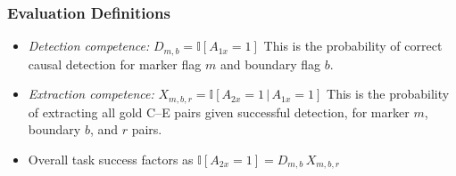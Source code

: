 \documentclass[conference]{IEEEtran}
\begin{document}
\subsubsection{Evaluation Definitions}
\begin{itemize}
    \item \emph{Detection competence:} $D_{m,b} = \mathbb{I}[A_{1x}=1]$ This is the probability of correct causal detection for marker flag $m$ and boundary flag $b$.
    \item \emph{Extraction competence:} $X_{m,b,r} = \mathbb{I}[A_{2x}=1\,|\,A_{1x}=1]$ This is the probability of extracting all gold C–E pairs given successful detection, for marker $m$, boundary $b$, and $r$ pairs.
    \item Overall task success factors as
$
\mathbb{I}[A_{2x}=1] = D_{m,b} \, X_{m,b,r}
$




\end{itemize}
\end{document}

